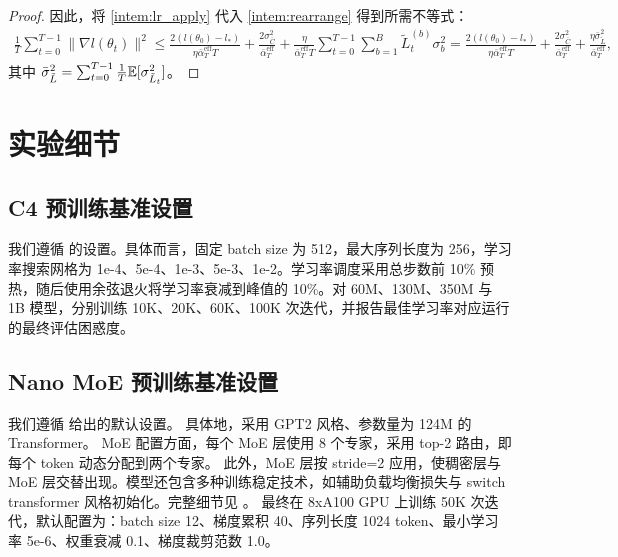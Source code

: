 \documentclass[11pt, a4paper, twocolumn, copyright, goog]{google}
\theoremstyle{plain}
\theoremstyle{definition}
\theoremstyle{remark}
\begin{document}
\begin{proof}
    因此，将 \eqref{intem:lr_apply} 代入 \eqref{intem:rearrange} 得到所需不等式：
    \begin{multline}
        \frac{1}{T} \sum_{t=0}^{T-1}  \|\nabla l(\theta_t) \|^2 
            \le \frac{2(l(\theta_0) - l_*) }{\eta \bar{\alpha}_{T}^{\textrm{eff}} T}
            +   \frac{2 \sigma^2_{\bar{C}}}{\bar{\alpha}_{T}^{\textrm{eff}}}  
            + \frac{\eta}{\bar{\alpha}_{T}^{\textrm{eff}} T} \sum_{t=0}^{T-1} \sum_{b=1}^{B} \tilde{L}_{t}^{(b)} \sigma_b^2 
                = \frac{2(l(\theta_0) - l_*) }{\eta \bar{\alpha}_{T}^{\textrm{eff}} T}
                +   \frac{2 \sigma^2_{\bar{C}}}{\bar{\alpha}_{T}^{\textrm{eff}}}  
                + \frac{\eta \bar{\sigma}^2_{\tilde{L}}}{ \bar{\alpha}_{T}^{\textrm{eff}}} ,
    \end{multline}
    其中 $ \bar{\sigma}^2_{\tilde{L}} = \sum_{t=0}^{T-1} \frac{1}{T} \mathbb{E} [\sigma^2_{\tilde{L}_t}]$。
\end{proof}



\section{实验细节} 

\subsection{C4 预训练基准设置} \label{appx:exp_details}
我们遵循 \citet{zhao2024galore} 的设置。具体而言，固定 batch size 为 512，最大序列长度为 256，学习率搜索网格为 1e-4、5e-4、1e-3、5e-3、1e-2。学习率调度采用总步数前 10\% 预热，随后使用余弦退火将学习率衰减到峰值的 10\%。对 60M、130M、350M 与 1B 模型，分别训练 10K、20K、60K、100K 次迭代，并报告最佳学习率对应运行的最终评估困惑度。

\subsection{Nano MoE 预训练基准设置} \label{appx:nano_moe-exp_details}
我们遵循 \citet{wolfe2024nanomoe} 给出的默认设置。 
具体地，采用 GPT2 \citep{radford2019language} 风格、参数量为 124M 的 Transformer。 
MoE 配置方面，每个 MoE 层使用 8 个专家，采用 top-2 路由，即每个 token 动态分配到两个专家。 
此外，MoE 层按 stride=2 应用，使稠密层与 MoE 层交替出现。模型还包含多种训练稳定技术，如辅助负载均衡损失与 switch transformer \citep{fedus2022switch} 风格初始化。完整细节见 \citet{wolfe2024nanomoe}。 
最终在 8xA100 GPU 上训练 50K 次迭代，默认配置为：batch size 12、梯度累积 40、序列长度 1024 token、最小学习率 5e-6、权重衰减 0.1、梯度裁剪范数 1.0。
\end{document}
